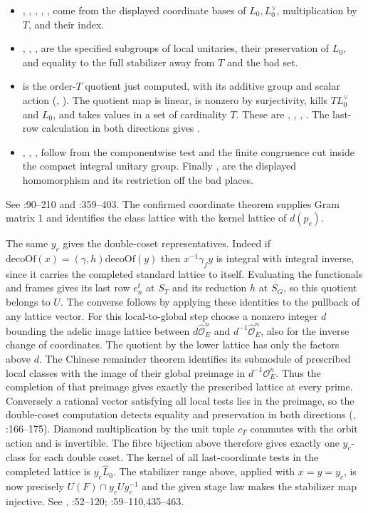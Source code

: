\begin{itemize}
\item {}, , , ,
,  come from the displayed coordinate bases
of $L_0,L_0^\vee$, multiplication by $T$, and their index.
\item {}, , , 
are the specified subgroups of local unitaries, their preservation of
$L_0$, and equality to the full stabilizer away from $T$ and the bad set.
\item {} is the order-$T$ quotient just computed, with its
additive group and scalar action (, ).
The quotient map  is linear, is nonzero by surjectivity, kills
$T L_0^\vee$ and $L_0$, and takes values in a set of cardinality $T$.
These are , , , .
The last-row calculation in both directions gives .
\item {}, , ,  follow
from the componentwise test and the finite congruence cut inside the
compact integral unitary group. Finally , 
are the displayed homomorphism and its restriction off the bad places.
\end{itemize}
See :90--210 and :359--403.
The confirmed coordinate theorem supplies Gram matrix $1$ and identifies
the class lattice with the kernel lattice of $d(p_c)$.

The same $y_c$ gives the double-coset representatives. Indeed if
$\mathrm{decoOf}(x)=(\gamma,h)\mathrm{decoOf}(y)$ then
$x^{-1}\gamma_f y$ is integral with integral inverse, since it carries
the completed standard lattice to itself. Evaluating the functionals
and frames gives its last row $e_n^t$ at $S_T$ and its reduction $h$
at $S_G$, so this quotient belongs to $U$. The converse follows by
applying these identities to the pullback of any lattice vector.
For this local-to-global step choose a nonzero integer $d$ bounding
the adelic image lattice between $d\widehat{\mathcal O}_E^n$ and
$d^{-1}\widehat{\mathcal O}_E^n$, also for the inverse change of
coordinates. The quotient by the lower lattice has only the factors
above $d$. The Chinese remainder theorem identifies its submodule of
prescribed local classes with the image of their global preimage in
$d^{-1}\mathcal O_E^n$. Thus the completion of that preimage gives
exactly the prescribed lattice at every prime. Conversely a rational
vector satisfying all local tests lies in the preimage, so the
double-coset computation detects equality and preservation in both
directions (, :166--175).
Diamond multiplication by the unit tuple $c_T$ commutes with the
orbit action and is invertible. The fibre bijection above therefore
gives exactly one $y_c$-class for each double coset. The kernel of
all last-coordinate tests in the completed lattice is $y_c\widehat L_0$.
The stabilizer range above, applied with $x=y=y_c$, is now precisely
$U(F)\cap y_cUy_c^{-1}$ and the given stage law makes the stabilizer map
injective. See , :52--120;
:59--110,435--463.

